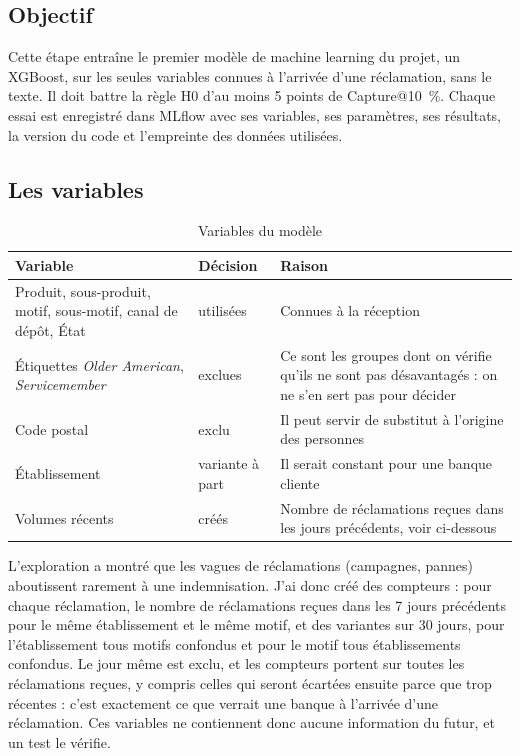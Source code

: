 \documentclass[11pt,a4paper]{article}
\begin{document}

\subsection{Objectif}

Cette étape entraîne le premier modèle de machine learning du projet, un XGBoost, sur les seules variables connues à l'arrivée d'une réclamation, sans le texte. Il doit battre la règle H0 d'au moins 5 points de Capture@10~\%. Chaque essai est enregistré dans MLflow avec ses variables, ses paramètres, ses résultats, la version du code et l'empreinte des données utilisées.

\subsection{Les variables}

\begin{table}[H]
\centering\small
\begin{tabularx}{\linewidth}{@{}l l Y@{}}
\toprule
Variable & Décision & Raison \\
\midrule
Produit, sous-produit, motif, sous-motif, canal de dépôt, État & utilisées & Connues à la réception \\
Étiquettes \emph{Older American}, \emph{Servicemember} & exclues & Ce sont les groupes dont on vérifie qu'ils ne sont pas désavantagés : on ne s'en sert pas pour décider \\
Code postal & exclu & Il peut servir de substitut à l'origine des personnes \\
Établissement & variante à part & Il serait constant pour une banque cliente \\
Volumes récents & créés & Nombre de réclamations reçues dans les jours précédents, voir ci-dessous \\
\bottomrule
\end{tabularx}
\caption{Variables du modèle}
\end{table}

L'exploration a montré que les vagues de réclamations (campagnes, pannes) aboutissent rarement à une indemnisation. J'ai donc créé des compteurs : pour chaque réclamation, le nombre de réclamations reçues dans les 7 jours précédents pour le même établissement et le même motif, et des variantes sur 30 jours, pour l'établissement tous motifs confondus et pour le motif tous établissements confondus. Le jour même est exclu, et les compteurs portent sur toutes les réclamations reçues, y compris celles qui seront écartées ensuite parce que trop récentes : c'est exactement ce que verrait une banque à l'arrivée d'une réclamation. Ces variables ne contiennent donc aucune information du futur, et un test le vérifie.
\end{document}
